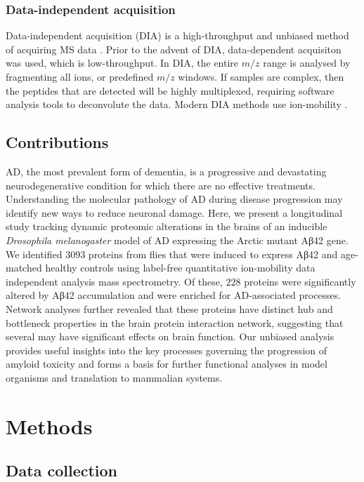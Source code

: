 \subsubsection{Data-independent acquisition}

Data-independent acquisition (DIA) is a high-throughput and unbiased method of acquiring MS data \cite{Gillet2016,Chapman2014}.
Prior to the advent of DIA, data-dependent acquisiton was used, which is low-throughput.
In DIA, the entire $m/z$ range is analysed by fragmenting all ions, or predefined $m/z$ windows.
If samples are complex, then the peptides that are detected will be highly multiplexed, requiring software analysis tools to deconvolute the data.
Modern DIA methods use ion-mobility \cite{Geromanos2012}.

\subsection{Contributions}

AD, the most prevalent form of dementia,
is a progressive and devastating neurodegenerative condition for which
there are no effective treatments.
Understanding the molecular pathology of AD during disease progression may identify
new ways to reduce neuronal damage.
Here, we present a longitudinal study tracking dynamic proteomic alterations in the brains
of an inducible \textit{Drosophila melanogaster} model of AD expressing the Arctic mutant Aβ42 gene.
We identified $3093$ proteins from flies that were induced to express Aβ42
and age-matched healthy controls
using label-free quantitative ion-mobility data independent analysis mass spectrometry.
Of these, $228$ proteins were significantly altered by Aβ42 accumulation
and were enriched for AD-associated processes.
Network analyses further revealed that these proteins have distinct hub
and bottleneck properties in the brain protein interaction network,
suggesting that several may have significant effects on brain function.
Our unbiased analysis provides useful insights into the key processes governing
the progression of amyloid toxicity and forms a basis for further functional analyses
in model organisms and translation to mammalian systems.

\section{Methods}
\label{methods}

\subsection{Data collection}

